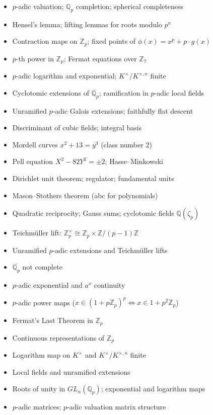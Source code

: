 \documentclass{amsart}
\begin{document}
\begin{itemize}
  \item $p$-adic valuation; $\mathbb{Q}_p$ completion; spherical completeness
  \item Hensel's lemma; lifting lemmas for roots modulo $p^n$
  \item Contraction maps on $\mathbb{Z}_p$; fixed points of $\phi(x)=x^p+p\cdot g(x)$
  \item $p$-th power in $\mathbb{Z}_p$; Fermat equations over $\mathbb{Z}_7$
  \item $p$-adic logarithm and exponential; $K^\times/K^{\times,n}$ finite
  \item Cyclotomic extensions of $\mathbb{Q}_p$; ramification in $p$-adic local fields
  \item Unramified $p$-adic Galois extensions; faithfully flat descent
  \item Discriminant of cubic fields; integral basis
  \item Mordell curves $x^2+13=y^3$ (class number 2)
  \item Pell equation $X^2-82Y^2=\pm2$; Hasse--Minkowski
  \item Dirichlet unit theorem; regulator; fundamental units
  \item Mason--Stothers theorem (abc for polynomials)
  \item Quadratic reciprocity; Gauss sums; cyclotomic fields $\mathbb{Q}(\zeta_p)$
  \item Teichm\"uller lift: $\mathbb{Z}_p^\times \cong \mathbb{Z}_p \times \mathbb{Z}/(p-1)\mathbb{Z}$
  \item Unramified $p$-adic extensions and Teichm\"uller lifts
  \item $\overline{\mathbb{Q}_p}$ not complete
  \item $p$-adic exponential and $a^x$ continuity
  \item $p$-adic power maps ($x \in (1+p\mathbb{Z}_p)^p \iff x \in 1+p^2\mathbb{Z}_p$)
  \item Fermat's Last Theorem in $\mathbb{Z}_p$
  \item Continuous representations of $\mathbb{Z}_p$
  \item Logarithm map on $K^\times$ and $K^\times/K^{\times,n}$ finite
  \item Local fields and unramified extensions
  \item Roots of unity in $GL_n(\mathbb{Q}_p)$; exponential and logarithm maps
  \item $p$-adic matrices; $p$-adic valuation matrix structure
\end{itemize}
\end{document}
